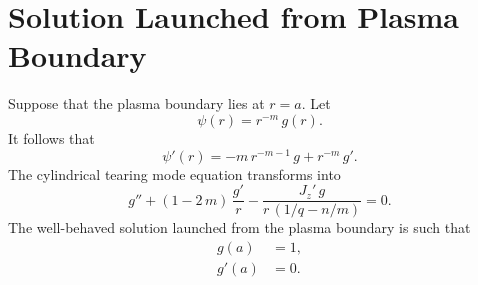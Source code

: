 \documentclass[notitlepage,12pt]{article}
\begin{document}
\section{Solution Launched from Plasma Boundary}
Suppose that the plasma boundary lies at $r=a$. 
Let
\begin{equation}
\psi(r) = r^{-m}\,g(r).
\end{equation}
It follows that
\begin{equation}
\psi'(r) = -m\,r^{-m-1}\,g+ r^{-m}\,g'.
\end{equation}
The cylindrical tearing mode equation transforms into
\begin{equation}
g'' + (1-2\,m)\,\frac{g'}{r} - \frac{J_z'\,g}{r\,(1/q-n/m)} = 0.
\end{equation}
The well-behaved solution launched from the plasma boundary is such that
\begin{align}
g(a) &= 1,\\[0.5ex]
g'(a) &= 0.
\end{align}
\end{document}
